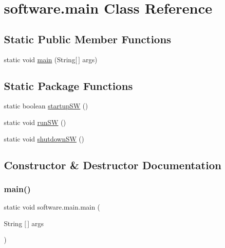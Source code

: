 \hypertarget{classsoftware_1_1main}{}\section{software.\+main Class Reference}
\label{classsoftware_1_1main}
\subsection*{Static Public Member Functions}
\begin{DoxyCompactItemize}
\item 
static void \hyperlink{classsoftware_1_1main_ac0127d8d05cf1b1a55d045818ce34a68}{main} (String\mbox{[}$\,$\mbox{]} args)
\end{DoxyCompactItemize}
\subsection*{Static Package Functions}
\begin{DoxyCompactItemize}
\item 
static boolean \hyperlink{classsoftware_1_1main_a704a81c9cf3d3fff3d223f49b9b98b67}{startup\+SW} ()
\item 
static void \hyperlink{classsoftware_1_1main_a20702c213493bc103f21bea8d159f810}{run\+SW} ()
\item 
static void \hyperlink{classsoftware_1_1main_a7ae92a61ad38d1c4bd6ba6be3ff49fa0}{shutdown\+SW} ()
\end{DoxyCompactItemize}


\subsection{Constructor \& Destructor Documentation}
\mbox{\label{classsoftware_1_1main_ac0127d8d05cf1b1a55d045818ce34a68}} 
\subsubsection{\texorpdfstring{main()}{main()}}
{\footnotesize\ttfamily static void software.\+main.\+main (\begin{DoxyParamCaption}\item[{String \mbox{[}$\,$\mbox{]}}]{args }\end{DoxyParamCaption})\hspace{0.3cm}{\ttfamily [static]}}

